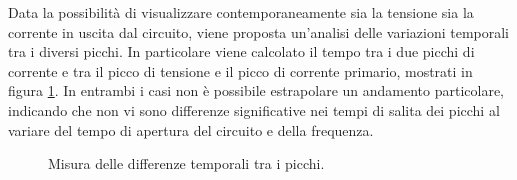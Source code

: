 Data la possibilità di visualizzare contemporaneamente sia la tensione sia la corrente in uscita dal circuito, viene proposta un'analisi delle variazioni temporali tra i diversi picchi. In particolare viene calcolato il tempo tra i due picchi di corrente e tra il picco di tensione e il picco di corrente primario, mostrati in figura \ref{fig:tempi}.
In entrambi i casi non è possibile estrapolare un andamento particolare, indicando che non vi sono differenze significative nei tempi di salita dei picchi al variare del tempo di apertura del circuito e della frequenza.

\begin{figure}
\centering
{}
\caption{Misura delle differenze temporali tra i picchi.}
\label{fig:tempi}
\end{figure}

